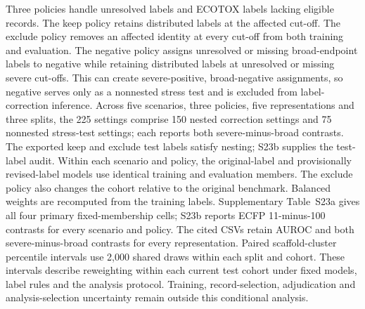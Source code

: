 \documentclass[10pt]{article}
\begin{document}
Three policies handle unresolved labels and ECOTOX labels lacking eligible records. The keep policy retains distributed labels at the affected cut-off. The exclude policy removes an affected identity at every cut-off from both training and evaluation. The negative policy assigns unresolved or missing broad-endpoint labels to negative while retaining distributed labels at unresolved or missing severe cut-offs. This can create severe-positive, broad-negative assignments, so negative serves only as a nonnested stress test and is excluded from label-correction inference. Across five scenarios, three policies, five representations and three splits, the 225 settings comprise 150 nested correction settings and 75 nonnested stress-test settings; each reports both severe-minus-broad contrasts. The exported keep and exclude test labels satisfy nesting; S23b supplies the test-label audit. Within each scenario and policy, the original-label and provisionally revised-label models use identical training and evaluation members. The exclude policy also changes the cohort relative to the original benchmark. Balanced weights are recomputed from the training labels. Supplementary Table~S23a gives all four primary fixed-membership cells; S23b reports ECFP 11-minus-100 contrasts for every scenario and policy. The cited CSVs retain AUROC and both severe-minus-broad contrasts for every representation. Paired scaffold-cluster percentile intervals use 2,000 shared draws within each split and cohort. These intervals describe reweighting within each current test cohort under fixed models, label rules and the analysis protocol. Training, record-selection, adjudication and analysis-selection uncertainty remain outside this conditional analysis.
\end{document}
